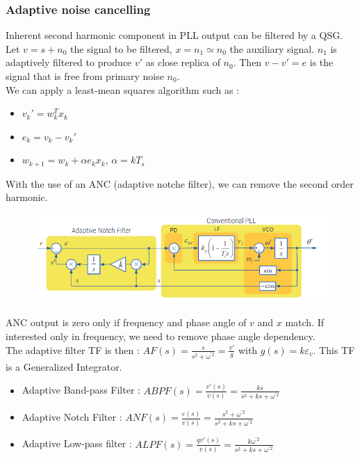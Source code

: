 \documentclass[../main.tex]{subfiles}
\begin{document}
\subsubsection{Adaptive noise cancelling}
Inherent second harmonic component in PLL output can be filtered by a QSG.\\
Let $v = s+n_0$ the signal to be filtered, $x = n_1 \simeq n_0$ the auxiliary signal. $n_1$ is adaptively filtered to produce $v'$ as close replica of $n_0$. Then $v-v' = e$ is the signal that is free from primary noise $n_0$.\\
We can apply a least-mean squares algorithm such as : \begin{itemize}
    \item $v_k' = w_k^Tx_k$
    \item $e_k = v_k-v_k'$
    \item $w_{k+1} = w_k + \alpha e_k x_k$, $\alpha = k T_s$
\end{itemize}
With the use of an ANC (adaptive notche filter), we can remove the second order harmonic.

\begin{figure}[hbt!]
    \centering
    \includegraphics[width=0.8\linewidth]{IMAGES/Indus_el/Screenshot from 2024-11-18 08-26-49.png}
\end{figure}

ANC output is zero only if frequency and phase angle of $v$ and $x$ match. If interested only in frequency, we need to remove phase angle dependency.\\
The adaptive filter TF is then : $AF(s) = \frac{s}{s^2 + \omega^{'2}} = \frac{v'}{g}$ with $g(s) = k \varepsilon_v$. This TF is a Generalized Integrator.\\
\begin{itemize}
    \item Adaptive Band-pass Filter : $ABPF(s) = \frac{v'(s)}{v(s)} = \frac{ks}{s^2 + ks+\omega^{'2}}$
    \item Adaptive Notch Filter : $ANF(s) = \frac{\varepsilon(s)}{v(s)} = \frac{s^2 + \omega^{'2}}{s^2 + ks + \omega^{'2}}$
    \item Adaptive Low-pass filter : $ALPF(s) = \frac{qv'(s)}{v(s)} = \frac{k \omega^{'2}}{s^2 + ks + \omega^{'2}}$
\end{itemize}
\end{document}
